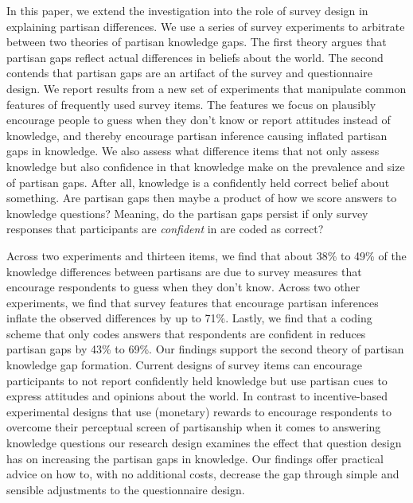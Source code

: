 \documentclass[12pt, letterpaper]{article}
\begin{document}
	In this paper, we extend the investigation into the role of survey design in explaining partisan differences. We use a series of survey experiments to arbitrate between two theories of partisan knowledge gaps. The first theory argues that partisan gaps reflect actual differences in beliefs about the world. The second contends that partisan gaps are an artifact of the survey and questionnaire design. We report results from a new set of experiments that manipulate common features of frequently used survey items. The features we focus on plausibly encourage people to guess when they don't know or report attitudes instead of knowledge, and thereby encourage partisan inference causing inflated partisan gaps in knowledge. We also assess what difference items that not only assess knowledge but also confidence in that knowledge make on the prevalence and size of partisan gaps. After all, knowledge is a confidently held correct belief about something. Are partisan gaps then maybe a product of how we score answers to knowledge questions? Meaning, do the partisan gaps persist if only survey responses that participants are \emph{confident} in are coded as correct?
	
	
	Across two experiments and thirteen items, we find that about 38\% to 49\% of the knowledge differences between partisans are due to survey measures that encourage respondents to guess when they don't know. Across two other experiments, we find that survey features that encourage partisan inferences inflate the observed differences by up to 71\%. Lastly, we find that a coding scheme that only codes answers that respondents are confident in reduces partisan gaps by 43\% to 69\%. Our findings support the second theory of partisan knowledge gap formation. Current designs of survey items can encourage participants to not report confidently held knowledge but use partisan cues to express attitudes and opinions about the world. In contrast to incentive-based experimental designs that use (monetary) rewards to encourage respondents to overcome their perceptual screen of partisanship when it comes to answering knowledge questions \citep[for example, see][]{bullocketal_2015, peterson2021partisan} our research design examines the effect that question design has on increasing the partisan gaps in knowledge. Our findings offer practical advice on how to, with no additional costs, decrease the gap through simple and sensible adjustments to the questionnaire design.
	
\end{document}
